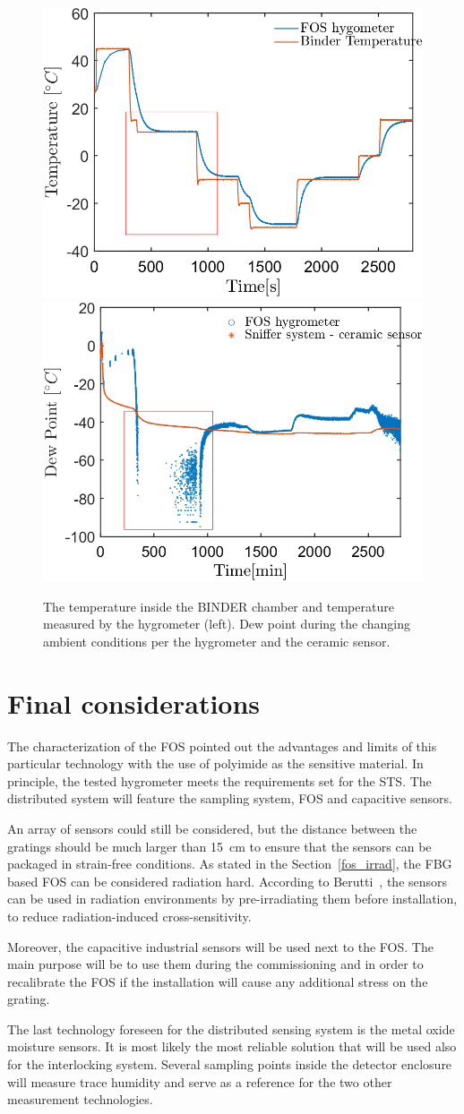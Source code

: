 \begin{figure}[!h]
\centering
\includegraphics[width=0.47\columnwidth]{Chapter5/images/FOS_performance_T.png}
\includegraphics[width=0.49\columnwidth]{Chapter5/images/FOS_performance1.png}
\caption{The temperature inside the BINDER chamber and temperature measured by the hygrometer (left). Dew point during the changing ambient conditions per the hygrometer and the ceramic sensor.}
\label{Tfig_comparison_2}
\end{figure}
\newpage
\section{Final considerations}

The characterization of the \gls{FOS} pointed out the advantages and limits of this particular technology with the use of polyimide as the sensitive material. In principle, the tested hygrometer meets the requirements set for the \gls{STS}. The distributed system will feature the sampling system, \gls{FOS} and capacitive sensors.

An array of sensors could still be considered, but the distance between the gratings should be much larger than \SI{15}{\cm} to ensure that the sensors can be packaged in strain-free conditions. As stated in the Section~\ref{fos_irrad}, the \gls{FBG} based \gls{FOS} can be considered radiation hard. According to Berutti~\cite{Berruti}, the sensors can be used in radiation environments by pre-irradiating them before installation, to reduce radiation-induced cross-sensitivity. 

Moreover, the capacitive industrial sensors will be used next to the \gls{FOS}. The main purpose will be to use them during the commissioning and in order to recalibrate the \gls{FOS} if the installation will cause any additional stress on the grating.

The last technology foreseen for the distributed sensing system is the metal oxide moisture sensors. It is most likely the most reliable solution that will be used also for the interlocking system. Several sampling points inside the detector enclosure will measure trace humidity and serve as a reference for the two other measurement technologies.